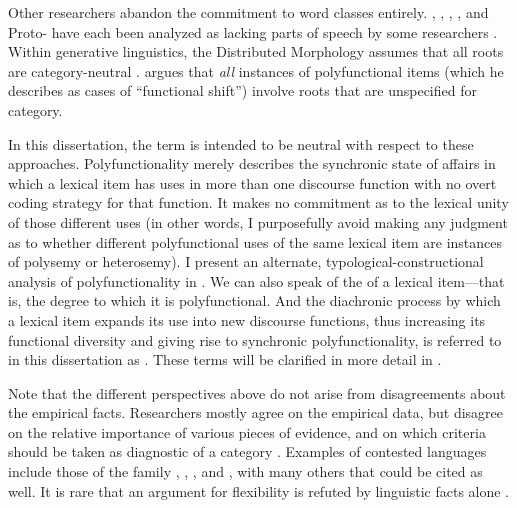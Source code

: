 Other researchers abandon the commitment to word classes entirely. , , , , and Proto- have each been analyzed as lacking parts of speech by some researchers . Within generative linguistics, the Distributed Morphology assumes that all roots are category-neutral \parencite{Siddiqi2018}. \textcite{Farrell2001} argues that \emph{all} instances of polyfunctional items (which he describes as cases of \enquote{functional shift}) involve roots that are unspecified for category.

In this dissertation, the term  is intended to be neutral with respect to these approaches. Polyfunctionality merely describes the synchronic state of affairs in which a lexical item has uses in more than one discourse function with no overt coding strategy for that function. It makes no commitment as to the lexical unity of those different uses (in other words, I purposefully avoid making any judgment as to whether different polyfunctional uses of the same lexical item are instances of polysemy or heterosemy). I present an alternate, typological-constructional analysis of polyfunctionality in . We can also speak of the  of a lexical item—that is, the degree to which it is polyfunctional. And the diachronic process by which a lexical item expands its use into new discourse functions, thus increasing its functional diversity and giving rise to synchronic polyfunctionality, is referred to in this dissertation as . These terms will be clarified in more detail in .

Note that the different perspectives above do not arise from disagreements about the empirical facts. Researchers mostly agree on the empirical data, but disagree on the relative importance of various pieces of evidence, and on which criteria should be taken as diagnostic of a category \parencites[235]{Wetzer1992}[32]{Stassen1997}[58]{CroftLier2012}. Examples of contested languages include those of the  family \parencite{Chafe2012},  \parencites{EvansOsada2005}{HengeveldRijkhoff2005},  \parencites[17]{SchachterShopen2007}{Floyd2011}, and  \parencites[352]{Robins1968}[62--63]{Hardjadibrata1985}, with many others that could be cited as well. It is rare that an argument for flexibility is refuted by linguistic facts alone .

